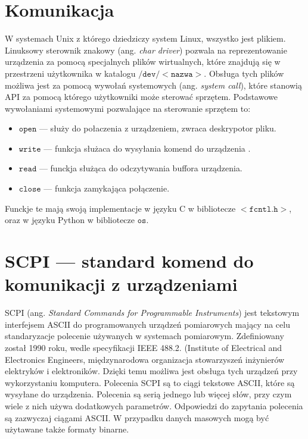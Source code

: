 \documentclass[a4paper, portrait,12pt]{report}
\begin{document}
\section{Komunikacja}
W systemach Unix z którego dziedziczy system Linux, wszystko jest plikiem. Linuksowy sterownik znakowy (ang. \textit{char driver}) pozwala na reprezentowanie urządzenia za pomocą specjalnych plików wirtualnych, które znajdują się w przestrzeni użytkownika w katalogu $\mathtt{/dev/<nazwa>}$. Obsługa tych plików możliwa jest za pomocą wywołań systemowych (ang. \textit{system call}), które stanowią API za pomocą którego użytkowniki może sterować sprzętem. Podstawowe wywołaniami systemowymi pozwalające na sterowanie sprzętem to:
\begin{itemize}
\item $\mathtt{open}$ --- służy do połaczenia z urządzeniem, zwraca deskrypotor pliku.
\item $\mathtt{write}$ --- funkcja służaca do wysyłania komend do urządzenia .
\item $\mathtt{read}$ --- funckja służąca do odczytywania buffora urządzenia.
\item $\mathtt{close}$ --- funkcja zamykająca połączenie.
\end{itemize}
Funckje te mają swoją implementacje w języku C w bibliotecze $<\mathtt{fcntl.h}>$, oraz w języku Python w bibliotecze $\mathtt{os}$.
\section{SCPI --- standard komend do komunikacji z urządzeniami}
SCPI  (ang. \textit{Standard  Commands  for  Programmable  Instruments}) jest tekstowym interfejsem ASCII do programowanych urządzeń pomiarowych mający na celu standaryzacje polecenie używanych w systemach pomiarowym. Zdefiniowany został 1990 roku, wedle specyfikacji IEEE 488.2. (Institute of Electrical and Electronics Engineers, międzynarodowa organizacja stowarzyszeń inżynierów elektryków i elektroników.  Dzięki temu możliwa jest obsługa tych urządzeń przy wykorzystaniu komputera. Polecenia SCPI są to ciągi tekstowe ASCII, które są wysyłane do urządzenia. Polecenia są serią jednego lub więcej słów, przy czym wiele z nich używa dodatkowych parametrów. Odpowiedzi do zapytania polecenia są zazwyczaj ciągami ASCII. W przypadku danych masowych mogą być użytawane także formaty binarne. \\
\end{document}
